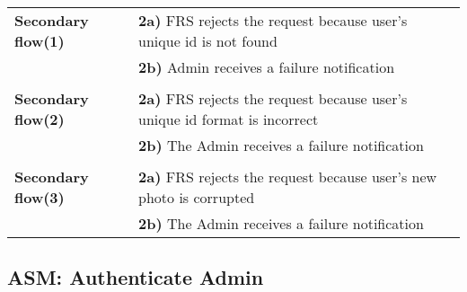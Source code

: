 \documentclass[a4paper,11pt]{article}
\begin{document}
\begin{tabular}{|p{3.5cm}|p{11.5cm}|}
    \\ \hline \rowcolor{Gray} & \\ \hline  
     
    \textbf{Secondary flow(1)} &  
    \textbf{2a)} FRS rejects the request because user's unique id is not found \\&
    \textbf{2b)} Admin receives a failure notification  
   
    \\ \hline \rowcolor{Gray} & \\ \hline  
   
    \textbf{Secondary flow(2)} &  
    \textbf{2a)} FRS rejects the request because user's unique id format is incorrect \\& 
    \textbf{2b)} The Admin receives a failure notification
   
    \\ \hline \rowcolor{Gray} & \\ \hline  
   
    \textbf{Secondary flow(3)} &  
    \textbf{2a)} FRS rejects the request because user's new photo is corrupted\\&
    \textbf{2b)} The Admin receives a failure notification 
    
    \\ \hline   
\end{tabular} 

\subsection{ASM: Authenticate Admin}
 
\end{document}
